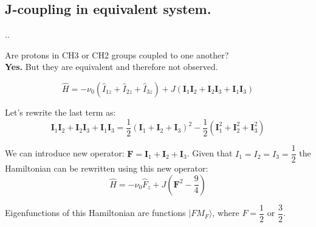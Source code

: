 \documentclass{beamer}
\begin{document}
\subsection{J-coupling in equivalent system.}
\begin{frame}{\thesection.\thesubsection. \insertsubsection}

Are protons in CH3 or CH2 groups coupled to one another? \\
\textbf{Yes.} But they are equivalent and therefore not observed.


	
	\begin{equation}
	\hat{H} = - \nu_0 (\hat{I}_{1z} + \hat{I}_{2z}+ \hat{I}_{3z}) + J (\bm{I}_1 \bm{I}_2 + \bm{I}_2 \bm{I}_3  + \bm{I}_1 \bm{I}_3 )
	\end{equation}
	
	Let's rewrite the last term as:
	\begin{equation}
	\bm{I}_1 \bm{I}_2 + \bm{I}_2 \bm{I}_3  + \bm{I}_1 \bm{I}_3 = \dfrac{1}{2} (\bm{I}_1 + \bm{I}_2 + \bm{I}_3 )^2 - \dfrac{1}{2} ( \bm{I}_1^2 + \bm{I}_2^2 + \bm{I}_3^2)
	\end{equation}
	
	We can introduce new operator: $\bm{F} =\bm{I}_1 + \bm{I}_2 + \bm{I}_3$. Given that $I_1=I_2=I_3=\dfrac{1}{2}$ the Hamiltonian can be rewritten using this new operator:
	\begin{equation}
	\hat{H} = - \nu_0 \hat{F}_{z} + J (\bm{F}^2 - \dfrac{9}{4} )    
	\end{equation}
	
	Eigenfunctions of this Hamiltonian are functions $\vert F M_F \rangle$, where $F=\dfrac{1}{2}$ or $\dfrac{3}{2}$.


\end{frame}
\end{document}
